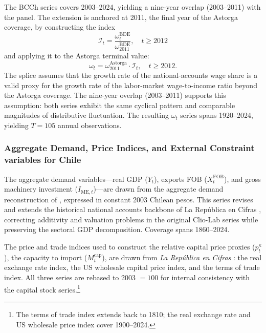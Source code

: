 The BCCh series covers 2003--2024, yielding a nine-year overlap
(2003--2011) with the \citet{Astorga2023} panel. The extension is
anchored at 2011, the final year of the Astorga coverage, by
constructing the index
\begin{equation}
	\mathcal{I}_t =
	\frac{\omega^{\text{BDE}}_t}{\omega^{\text{BDE}}_{2011}},
	\quad t \geq 2012
	\label{eq:414:wage_splice_index}
\end{equation}
and applying it to the Astorga terminal value:
\begin{equation}
	\omega_t = \omega^{\text{Astorga}}_{2011}
	\cdot \mathcal{I}_t,
	\quad t \geq 2012.
	\label{eq:414:wage_splice}
\end{equation}
The splice assumes that the growth rate of the national-accounts
wage share is a valid proxy for the growth rate of the
labor-market wage-to-income ratio beyond the Astorga coverage.
The nine-year overlap (2003--2011) supports this assumption:
both series exhibit the same cyclical pattern and comparable
magnitudes of distributive fluctuation. The resulting $\omega_t$
series spans 1920--2024, yielding $T = 105$ annual observations.


\subsubsection{Aggregate Demand, Price Indices, and External Constraint variables for Chile}
\label{sec:416:chile_demand}

The aggregate demand variables---real GDP ($Y_t$), exports FOB
($X^{\text{FOB}}_t$), and gross machinery investment
($I_{\text{ME},t}$)---are drawn from the aggregate demand
reconstruction of \citet{PerezEyzaguirre2019}, expressed in constant
2003 Chilean pesos. This series revises and extends the historical
national accounts backbone of La República en Cifras
\citep{LudersDiazWagner2016}, correcting additivity and valuation
problems in the original Clio-Lab series while preserving the
sectoral GDP decomposition. Coverage spans 1860--2024.

The price and trade indices used to construct the relative capital
price proxies ($p^{\kappa}_t$), the capacity to
import ($M^{\text{cap}}_t$), are drawn from \textit{La República en Cifras}
\citep{LudersDiazWagner2016}: the real exchange rate index, the US wholesale capital price index, and the
terms of trade index. All three series are rebased to
2003 $= 100$ for internal consistency with the capital stock
series.\footnote{The terms of trade index extends back to 1810;
	the real exchange rate and US wholesale price index cover
	1900--2024.}

